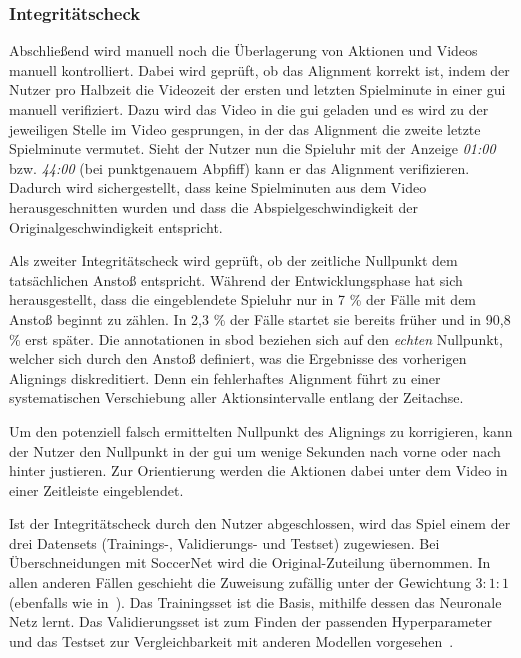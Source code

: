 %


\label{lst:sbod}

\subsubsection{Integritätscheck}

Abschließend wird manuell noch die Überlagerung von Aktionen und Videos manuell kontrolliert.
Dabei wird geprüft, ob das Alignment korrekt ist, indem der Nutzer pro Halbzeit die Videozeit der ersten und letzten Spielminute in einer \gls{gui} manuell verifiziert.
Dazu wird das Video in die \gls{gui} geladen und es wird zu der jeweiligen Stelle im Video gesprungen, in der das Alignment die zweite \bzw letzte Spielminute vermutet.
Sieht der Nutzer nun \zB die Spieluhr mit der Anzeige \emph{01:00} bzw. \emph{44:00} (bei punktgenauem Abpfiff) kann er das Alignment verifizieren.
Dadurch wird sichergestellt, dass keine Spielminuten aus dem Video herausgeschnitten wurden und dass die Abspielgeschwindigkeit der Originalgeschwindigkeit entspricht.

Als zweiter Integritätscheck wird geprüft, ob der zeitliche Nullpunkt dem tatsächlichen Anstoß entspricht.
Während der Entwicklungsphase hat sich herausgestellt, dass die eingeblendete Spieluhr nur in 7 \% der Fälle mit dem Anstoß beginnt zu zählen.
In 2,3 \% der Fälle startet sie bereits früher und in 90,8 \% erst später.
Die \gls{annotationen} in \gls{sbod} beziehen sich auf den \emph{echten} Nullpunkt, welcher sich durch den Anstoß definiert, was die Ergebnisse des vorherigen Alignings diskreditiert.
Denn ein fehlerhaftes Alignment führt zu einer systematischen Verschiebung aller Aktionsintervalle entlang der Zeitachse.

Um den potenziell falsch ermittelten Nullpunkt des Alignings zu korrigieren, kann der Nutzer den Nullpunkt in der \gls{gui} um wenige Sekunden nach vorne oder nach hinter justieren.
Zur Orientierung werden die Aktionen dabei unter dem Video in einer Zeitleiste eingeblendet.

Ist der Integritätscheck durch den Nutzer abgeschlossen, wird das Spiel einem der drei Datensets (Trainings-, Validierungs- und Testset) zugewiesen.
Bei Überschneidungen mit SoccerNet wird die Original-Zuteilung übernommen.
In allen anderen Fällen geschieht die Zuweisung zufällig unter der Gewichtung $3:1:1$ (ebenfalls wie in~\cite{Giancola18}).
Das Trainingsset ist die Basis, mithilfe dessen das Neuronale Netz lernt.
Das Validierungsset ist zum Finden der passenden Hyperparameter und das Testset zur Vergleichbarkeit mit anderen Modellen vorgesehen~\cite{Burkov19}.

